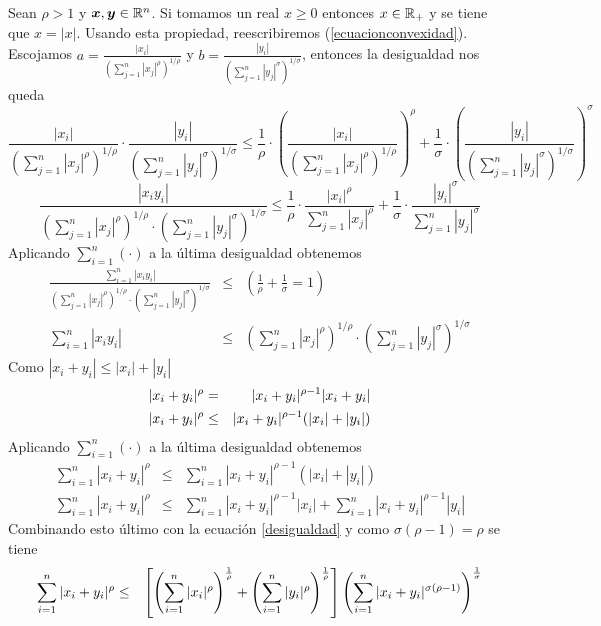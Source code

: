 \begin{demostracion}
Sean $\rho>1$ y $\boldsymbol{x},\boldsymbol{y}\in \mathbb{R}^n$. Si tomamos un real $x\geq 0$ entonces $x \in \mathbb{R}_{+}$ y se tiene que $x=|x|$. Usando esta propiedad, reescribiremos (\ref{ecuacionconvexidad}).
Escojamos $a=\frac{|x_i|}{(\sum_{j=1}^n |x_j|^\rho )^{1/\rho}}$ y
$b=\frac{|y_i|}{(\sum_{j=1}^n |y_j|^\sigma)^{1/\sigma}}$, entonces la desigualdad nos queda
$$\frac{|x_i|}{(\sum_{j=1}^n |x_j|^\rho )^{1/\rho}} \cdot \frac{|y_i|}{(\sum_{j=1}^n |y_j|^\sigma )^{1/\sigma}} \leq \frac{1}{\rho}\cdot \left(\frac{|x_i|}{(\sum_{j=1}^n |x_j|^\rho )^{1/\rho}} \right)^\rho + \frac{1}{\sigma}\cdot \left(\frac{|y_i|}{(\sum_{j=1}^n |y_j|^\sigma )^{1/\sigma}} \right)^\sigma $$
$$\frac{|x_i y_i|}{(\sum_{j=1}^n |x_j|^\rho )^{1/\rho} \cdot (\sum_{j=1}^n |y_j|^\sigma )^{1/\sigma}} \leq \frac{1}{\rho}\cdot \frac{|x_i|^\rho}{\sum_{j=1}^n |x_j|^\rho} + \frac{1}{\sigma}\cdot \frac{|y_i|^\sigma}{\sum_{j=1}^n |y_j|^\sigma}$$
Aplicando $\sum_{i=1}^n(\cdot)$ a la \'ultima desigualdad obtenemos
\begin{eqnarray}
\frac{\sum_{i=1}^n |x_i y_i|}{(\sum_{j=1}^n |x_j|^\rho )^{1/\rho} \cdot (\sum_{j=1}^n |y_j|^\sigma )^{1/\sigma}} &\leq& \left(\frac{1}{\rho}+\frac{1}{\sigma} = 1 \right) \nonumber \\
\sum_{i=1}^n |x_i y_i| &\leq& \left(\sum_{j=1}^n |x_j|^\rho \right)^{1/\rho} \cdot \left(\sum_{j=1}^n |y_j|^\sigma \right)^{1/\sigma} \label{desigualdad}
\end{eqnarray}
Como $|x_i+y_i|\leq |x_i|+|y_i|$
\begin{eqnarray*}
|x_i + y_i|^\rho &=& |x_i + y_i|^{\rho-1}|x_i + y_i| \cr
|x_i + y_i|^\rho   &\leq& |x_i + y_i|^{\rho-1}(|x_i|+|y_i|) 
\end{eqnarray*}
Aplicando $\sum_{i=1}^n(\cdot)$ a la \'ultima desigualdad obtenemos
\begin{eqnarray}
\sum_{i=1}^n |x_i + y_i|^\rho   &\leq& \sum_{i=1}^n |x_i+y_i|^{\rho-1}(|x_i|+|y_i|) \nonumber \\
\sum_{i=1}^n |x_i + y_i|^\rho   &\leq& \sum_{i=1}^n |x_i+y_i|^{\rho-1} |x_i| + \sum_{i=1}^n |x_i+y_i|^{\rho-1}|y_i| 
\end{eqnarray}
Combinando esto \'ultimo con la ecuaci\'on \eqref{desigualdad} y como $\sigma (\rho-1) = \rho$ se tiene
\begin{eqnarray*}
\sum_{i=1}^n |x_i + y_i|^\rho &\leq& \left[\left(\sum_{i=1}^n |x_i|^\rho \right)^{\frac{1}{\rho}} + \left(\sum_{i=1}^n |y_i|^\rho \right)^{\frac{1}{\rho}} \right] \left(\sum_{i=1}^n |x_i+y_i|^{\sigma (\rho-1)} \right)^{\frac{1}{\sigma}} \cr

\end{eqnarray*}
\end{demostracion}
